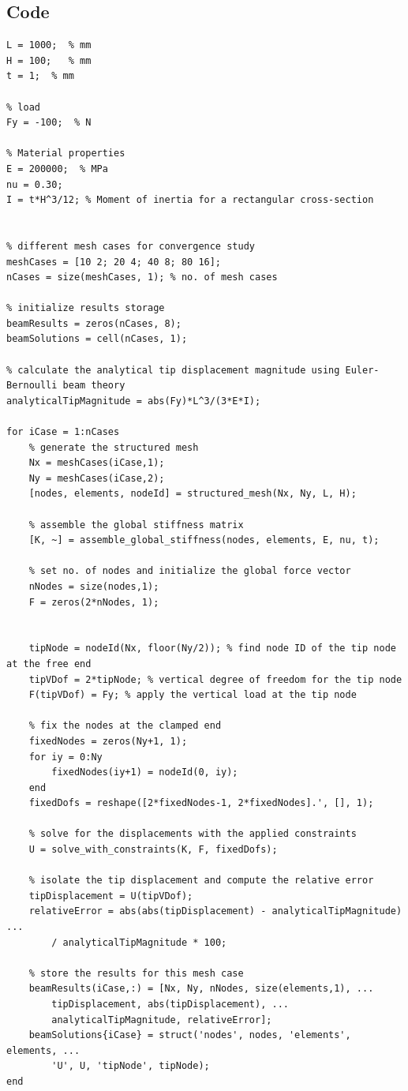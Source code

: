 \subsection{Code}
\begin{lstlisting}[style=matlabcode]
% dimensions 
L = 1000;  % mm
H = 100;   % mm
t = 1;  % mm

% load 
Fy = -100;  % N

% Material properties
E = 200000;  % MPa
nu = 0.30; 
I = t*H^3/12; % Moment of inertia for a rectangular cross-section


% different mesh cases for convergence study
meshCases = [10 2; 20 4; 40 8; 80 16];
nCases = size(meshCases, 1); % no. of mesh cases

% initialize results storage
beamResults = zeros(nCases, 8);
beamSolutions = cell(nCases, 1);

% calculate the analytical tip displacement magnitude using Euler-Bernoulli beam theory
analyticalTipMagnitude = abs(Fy)*L^3/(3*E*I);

for iCase = 1:nCases
    % generate the structured mesh
    Nx = meshCases(iCase,1);
    Ny = meshCases(iCase,2);
    [nodes, elements, nodeId] = structured_mesh(Nx, Ny, L, H);

    % assemble the global stiffness matrix
    [K, ~] = assemble_global_stiffness(nodes, elements, E, nu, t);

    % set no. of nodes and initialize the global force vector
    nNodes = size(nodes,1);
    F = zeros(2*nNodes, 1);


    tipNode = nodeId(Nx, floor(Ny/2)); % find node ID of the tip node at the free end
    tipVDof = 2*tipNode; % vertical degree of freedom for the tip node
    F(tipVDof) = Fy; % apply the vertical load at the tip node

    % fix the nodes at the clamped end
    fixedNodes = zeros(Ny+1, 1);
    for iy = 0:Ny
        fixedNodes(iy+1) = nodeId(0, iy);
    end
    fixedDofs = reshape([2*fixedNodes-1, 2*fixedNodes].', [], 1);

    % solve for the displacements with the applied constraints
    U = solve_with_constraints(K, F, fixedDofs);

    % isolate the tip displacement and compute the relative error
    tipDisplacement = U(tipVDof);
    relativeError = abs(abs(tipDisplacement) - analyticalTipMagnitude) ...
        / analyticalTipMagnitude * 100;

    % store the results for this mesh case
    beamResults(iCase,:) = [Nx, Ny, nNodes, size(elements,1), ...
        tipDisplacement, abs(tipDisplacement), ...
        analyticalTipMagnitude, relativeError];
    beamSolutions{iCase} = struct('nodes', nodes, 'elements', elements, ...
        'U', U, 'tipNode', tipNode);
end


\end{lstlisting}
